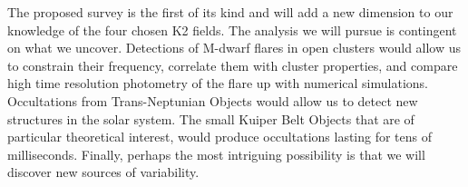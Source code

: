 \documentclass[11pt]{article}
\begin{document}
The proposed survey is the first of its kind and will add a new dimension to our knowledge of the four chosen K2 fields. The analysis we will pursue is contingent on what we uncover. Detections of M-dwarf flares in open clusters would allow us to constrain their frequency, correlate them with cluster properties, and compare high time resolution photometry of the flare up with numerical simulations. Occultations from Trans-Neptunian Objects would allow us to detect new structures in the solar system. The small Kuiper Belt Objects that are of particular theoretical interest, would produce occultations lasting for tens of milliseconds. Finally, perhaps the most intriguing possibility is that we will discover new sources of variability. 









\end{document}
